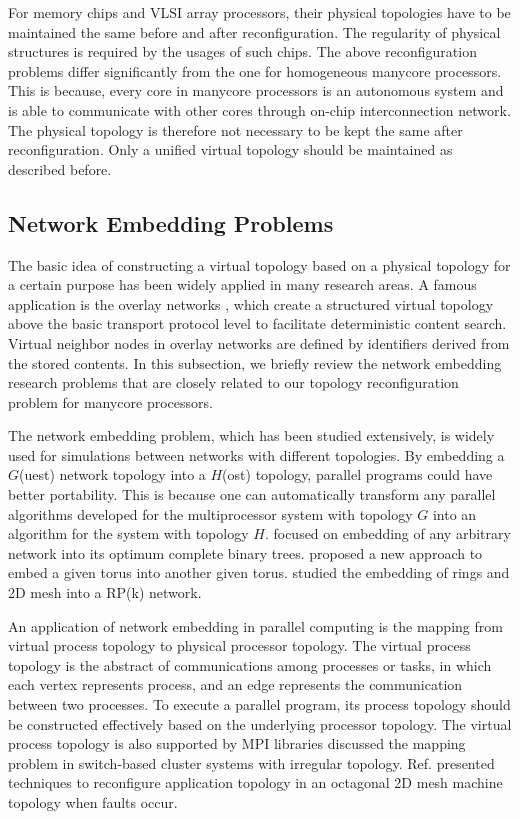 For memory chips and VLSI array processors, their physical topologies have to be maintained the same before and after reconfiguration. The regularity of physical structures is required by the usages of such chips. The above reconfiguration problems differ significantly from the one for homogeneous manycore processors. This is because, every core in manycore processors is an autonomous system and is able to communicate with other cores through on-chip interconnection network. The physical topology is therefore not necessary to be kept the same after reconfiguration. Only a unified virtual topology should be maintained as described before.

\subsection{Network Embedding Problems}

The basic idea of constructing a virtual topology based on a physical topology for a certain purpose has been widely applied in many research areas. A famous application is the overlay networks \cite{doval2003overlay}, which create a structured virtual topology above the basic transport protocol level to facilitate deterministic content search. Virtual neighbor nodes in overlay networks are defined by identifiers derived from the stored contents. In this subsection, we briefly review the network embedding research problems that are closely related to our topology reconfiguration problem for manycore processors.

The network embedding problem, which has been studied extensively, is widely used for simulations between networks with different topologies. By embedding a $G$(uest) network topology into a $H$(ost) topology, parallel programs could have better portability. This is because one can automatically transform any parallel algorithms developed for the multiprocessor system with topology $G$ into an algorithm for the system with topology $H$. \cite{cong1993lower} focused on embedding of any arbitrary network into its optimum complete binary trees. \cite{kim1999approach} proposed a new approach to embed a given torus into another given torus.
\cite{liu2005topological} studied the embedding of rings and 2D mesh into a RP(k) network.

An application of network embedding in parallel computing is the mapping from virtual process topology to physical processor topology. The virtual process topology is the abstract of communications among processes or tasks, in which each vertex represents process, and an edge represents the communication between two processes. To execute a parallel program, its process topology should be constructed effectively based on the underlying processor topology. The virtual process topology is also supported by MPI libraries \cite{lusk2009mpi,moh2001mapping} discussed the mapping problem in switch-based cluster systems with irregular topology. Ref.\cite{bauch1996reconfiguration} presented techniques to reconfigure application topology in an octagonal 2D mesh machine topology when faults occur.

